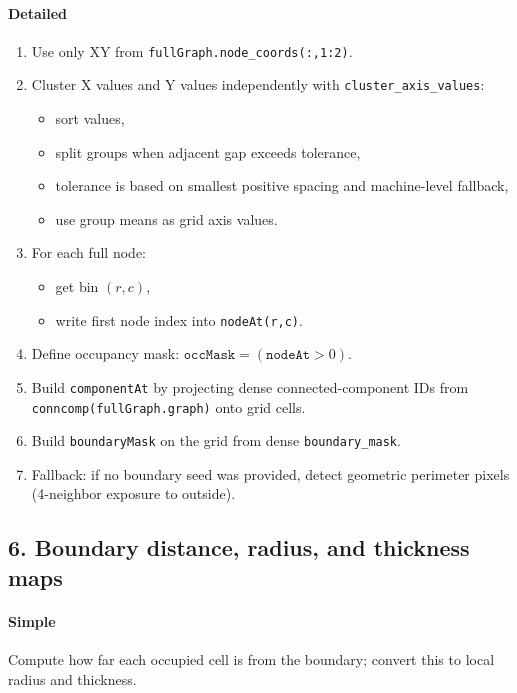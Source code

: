 \documentclass[11pt]{article}
\begin{document}
\paragraph{Detailed}
\begin{enumerate}
  \item Use only XY from \texttt{fullGraph.node\_coords(:,1:2)}.
  \item Cluster X values and Y values independently with \texttt{cluster\_axis\_values}:
  \begin{itemize}
    \item sort values,
    \item split groups when adjacent gap exceeds tolerance,
    \item tolerance is based on smallest positive spacing and machine-level fallback,
    \item use group means as grid axis values.
  \end{itemize}
  \item For each full node:
  \begin{itemize}
    \item get bin \((r,c)\),
    \item write first node index into \texttt{nodeAt(r,c)}.
  \end{itemize}
  \item Define occupancy mask: \(\texttt{occMask} = (\texttt{nodeAt} > 0)\).
  \item Build \texttt{componentAt} by projecting dense connected-component IDs from
  \texttt{conncomp(fullGraph.graph)} onto grid cells.
  \item Build \texttt{boundaryMask} on the grid from dense \texttt{boundary\_mask}.
  \item Fallback: if no boundary seed was provided, detect geometric perimeter pixels
  (4-neighbor exposure to outside).
\end{enumerate}

\subsection*{6. Boundary distance, radius, and thickness maps}
\paragraph{Simple}
Compute how far each occupied cell is from the boundary; convert this to local radius and thickness.
\end{document}
